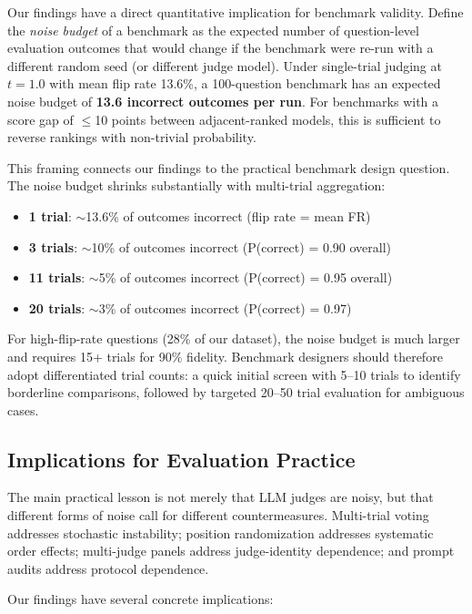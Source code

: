 \documentclass{ijclclp}
\begin{document}
Our findings have a direct quantitative implication for benchmark validity. Define the \textit{noise budget} of a benchmark as the expected number of question-level evaluation outcomes that would change if the benchmark were re-run with a different random seed (or different judge model). Under single-trial judging at $t=1.0$ with mean flip rate 13.6\%, a 100-question benchmark has an expected noise budget of \textbf{13.6 incorrect outcomes per run}. For benchmarks with a score gap of $\leq$10 points between adjacent-ranked models, this is sufficient to reverse rankings with non-trivial probability.

This framing connects our findings to the practical benchmark design question. The noise budget shrinks substantially with multi-trial aggregation:

\begin{itemize}[nosep]
    \item \textbf{1 trial}: $\sim$13.6\% of outcomes incorrect (flip rate = mean FR)
    \item \textbf{3 trials}: $\sim$10\% of outcomes incorrect (P(correct) = 0.90 overall)
    \item \textbf{11 trials}: $\sim$5\% of outcomes incorrect (P(correct) = 0.95 overall)
    \item \textbf{20 trials}: $\sim$3\% of outcomes incorrect (P(correct) = 0.97)
\end{itemize}

For high-flip-rate questions (28\% of our dataset), the noise budget is much larger and requires 15+ trials for 90\% fidelity. Benchmark designers should therefore adopt differentiated trial counts: a quick initial screen with 5--10 trials to identify borderline comparisons, followed by targeted 20--50 trial evaluation for ambiguous cases.

\subsection{Implications for Evaluation Practice}
\label{sec:discussion_recs}

The main practical lesson is not merely that LLM judges are noisy, but that different forms of noise call for different countermeasures. Multi-trial voting addresses stochastic instability; position randomization addresses systematic order effects; multi-judge panels address judge-identity dependence; and prompt audits address protocol dependence.

Our findings have several concrete implications:
\end{document}
